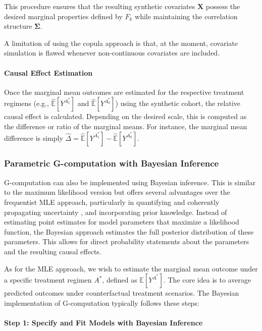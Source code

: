 \documentclass[article]{jss}
\begin{document}
This procedure ensures that the resulting synthetic covariates $\mathbf{X}$ possess the desired marginal properties defined by $F_k$ while maintaining the correlation structure $\boldsymbol{\Sigma}$.

A limitation of using the copula approach is that, at the moment, covariate simulation is flawed whenever non-continuous covariates are included.

\paragraph{Causal Effect Estimation}
Once the marginal mean outcomes are estimated for the respective treatment regimens (e.g., $\hat{\mathbb{E}}[Y^{A_1^*}]$ and $\hat{\mathbb{E}}[Y^{A_0^*}]$) using the synthetic cohort, the relative causal effect is calculated. Depending on the desired scale, this is computed as the difference or ratio of the marginal means. For instance, the marginal mean difference is simply $\hat{\Delta} = \hat{\mathbb{E}}[Y^{A_1^*}] - \hat{\mathbb{E}}[Y^{A_0^*}]$.

\subsubsection{Parametric G-computation with Bayesian Inference}
G-computation can also be implemented using Bayesian inference. This is similar to the maximum likelihood version but offers several advantages over the frequentist MLE approach, particularly in quantifying and coherently propagating uncertainty \citep{RemiroAzocar2022a}, and incorporating prior knowledge. Instead of estimating point estimates for model parameters that maximize a likelihood function, the Bayesian approach estimates the full posterior distribution of these parameters. This allows for direct probability statements about the parameters and the resulting causal effects.

As for the MLE approach, we wish to estimate the marginal mean outcome under a specific treatment regimen $A^*$, defined as $\mathbb{E}[Y^{A^*}]$. The core idea is to average predicted outcomes under counterfactual treatment scenarios. The Bayesian implementation of G-computation typically follows these steps:

\paragraph{Step 1: Specify and Fit Models with Bayesian Inference}
\end{document}
